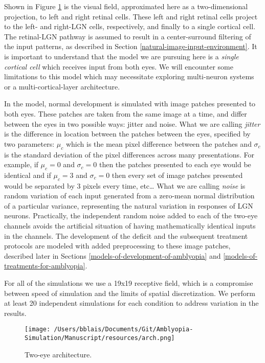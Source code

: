 \documentclass[
  onecolumn]{article}
\begin{document}
Shown in Figure \ref{fig:arch} is the visual field, approximated here as
a two-dimensional projection, to left and right retinal cells. These
left and right retinal cells project to the left- and right-LGN cells,
respectively, and finally to a single cortical cell. The retinal-LGN
pathway is assumed to result in a center-surround filtering of the input
patterns, as described in Section \ref{natural-image-input-environment}.
It is important to understand that the model we are pursuing here is a
\emph{single cortical cell} which receives input from both eyes. We will
encounter some limitations to this model which may necessitate exploring
multi-neuron systems or a multi-cortical-layer architecture.

In the model, normal development is simulated with image patches
presented to both eyes. These patches are taken from the same image at a
time, and differ between the eyes in two possible ways: jitter and
noise. What we are calling \emph{jitter} is the difference in location
between the patches between the eyes, specified by two parameters:
\(\mu_c\) which is the mean pixel difference between the patches and
\(\sigma_c\) is the standard deviation of the pixel differences across
many presentations. For example, if \(\mu_c=0\) and \(\sigma_c=0\) then
the patches presented to each eye would be identical and if \(\mu_c=3\)
and \(\sigma_c=0\) then every set of image patches presented would be
separated by 3 pixels every time, etc\ldots{} What we are calling
\emph{noise} is random variation of each input generated from a
zero-mean normal distribution of a particular variance, representing the
natural variation in responses of LGN neurons. Practically, the
independent random noise added to each of the two-eye channels avoids
the artificial situation of having mathematically identical inputs in
the channels. The development of the deficit and the subsequent
treatment protocols are modeled with added preprocessing to these image
patches, described later in Sections
\ref{models-of-development-of-amblyopia} and
\ref{models-of-treatments-for-amblyopia}.

For all of the simulations we use a 19x19 receptive field, which is a
compromise between speed of simulation and the limits of spatial
discretization. We perform at least 20 independent simulations for each
condition to address variation in the results.

\begin{figure}
\hypertarget{fig:arch}{%
\centering
\texttt{[image: /Users/bblais/Documents/Git/Amblyopia-Simulation/Manuscript/resources/arch.png]}
\caption{Two-eye architecture.}\label{fig:arch}
}
\end{figure}
\end{document}
